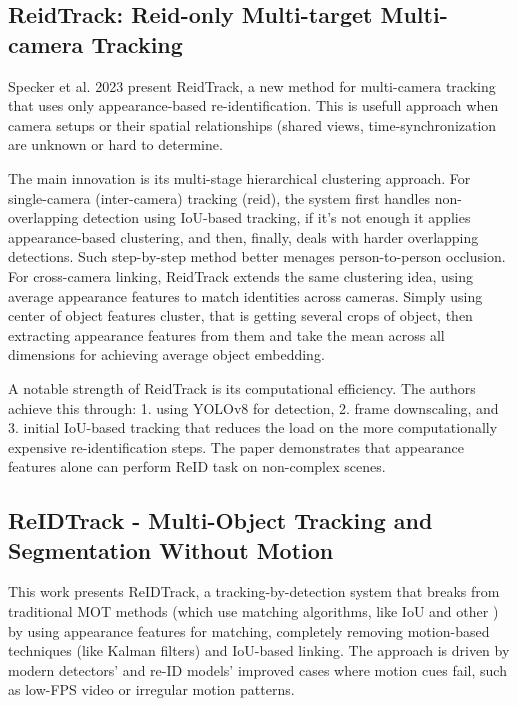 \documentclass[12pt, a4paper]{article}
\begin{document}
\subsection{ReidTrack: Reid-only Multi-target Multi-camera Tracking \cite{Specker-ReID}}

Specker et al. 2023 present ReidTrack, a new method for multi-camera tracking that uses only appearance-based re-identification. This is usefull approach when camera setups or their spatial relationships (shared views, time-synchronization are unknown or hard to determine.

The main innovation is its multi-stage hierarchical clustering approach. For single-camera (inter-camera) tracking (reid), the system first handles non-overlapping detection using IoU-based tracking, if it's not enough it applies appearance-based clustering, and then, finally, deals with harder overlapping detections. Such step-by-step method better menages person-to-person occlusion. For cross-camera linking, ReidTrack extends the same clustering idea, using average appearance features to match identities across cameras. Simply using center of object features cluster, that is getting several crops of object, then extracting appearance features from them and take the mean across all dimensions for achieving average object embedding. 

A notable strength of ReidTrack is its computational efficiency. The authors achieve this through: 1. using YOLOv8 for detection, 2. frame downscaling, and  3. initial IoU-based tracking that reduces the load on the more computationally expensive re-identification steps. The paper demonstrates that appearance features alone can perform ReID task on non-complex scenes. 

\subsection{ReIDTrack - Multi-Object Tracking and Segmentation Without Motion \cite{reid-object-segmentaion}}

This work presents ReIDTrack, a tracking-by-detection system that breaks from traditional MOT methods (which use matching algorithms, like IoU and other \cite{SORT, DeepSORT, StrongSORT}) by using appearance features for matching, completely removing motion-based techniques (like Kalman filters) and IoU-based linking. The approach is driven by modern detectors' and re-ID models' improved cases where motion cues fail, such as low-FPS video or irregular motion patterns.
\end{document}
